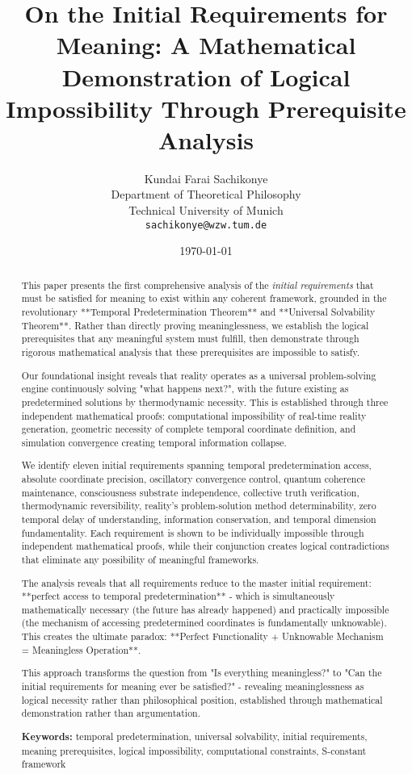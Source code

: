 \documentclass[12pt,a4paper]{article}
\title{On the Initial Requirements for Meaning: A Mathematical Demonstration of Logical Impossibility Through Prerequisite Analysis}
\author{Kundai Farai Sachikonye\\
Department of Theoretical Philosophy\\
Technical University of Munich\\
\texttt{sachikonye@wzw.tum.de}}
\date{\today}
\begin{document}
\maketitle

\begin{abstract}
This paper presents the first comprehensive analysis of the \textit{initial requirements} that must be satisfied for meaning to exist within any coherent framework, grounded in the revolutionary **Temporal Predetermination Theorem** and **Universal Solvability Theorem**. Rather than directly proving meaninglessness, we establish the logical prerequisites that any meaningful system must fulfill, then demonstrate through rigorous mathematical analysis that these prerequisites are impossible to satisfy. 

Our foundational insight reveals that reality operates as a universal problem-solving engine continuously solving "what happens next?", with the future existing as predetermined solutions by thermodynamic necessity. This is established through three independent mathematical proofs: computational impossibility of real-time reality generation, geometric necessity of complete temporal coordinate definition, and simulation convergence creating temporal information collapse.

We identify eleven initial requirements spanning temporal predetermination access, absolute coordinate precision, oscillatory convergence control, quantum coherence maintenance, consciousness substrate independence, collective truth verification, thermodynamic reversibility, reality's problem-solution method determinability, zero temporal delay of understanding, information conservation, and temporal dimension fundamentality. Each requirement is shown to be individually impossible through independent mathematical proofs, while their conjunction creates logical contradictions that eliminate any possibility of meaningful frameworks.

The analysis reveals that all requirements reduce to the master initial requirement: **perfect access to temporal predetermination** - which is simultaneously mathematically necessary (the future has already happened) and practically impossible (the mechanism of accessing predetermined coordinates is fundamentally unknowable). This creates the ultimate paradox: **Perfect Functionality + Unknowable Mechanism = Meaningless Operation**.

This approach transforms the question from "Is everything meaningless?" to "Can the initial requirements for meaning ever be satisfied?" - revealing meaninglessness as logical necessity rather than philosophical position, established through mathematical demonstration rather than argumentation.

\textbf{Keywords:} temporal predetermination, universal solvability, initial requirements, meaning prerequisites, logical impossibility, computational constraints, S-constant framework
\end{abstract}
\end{document}
